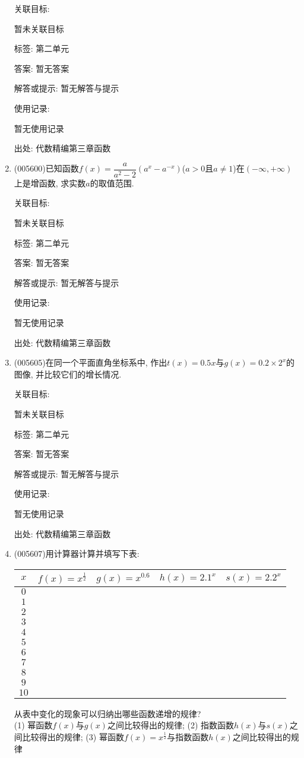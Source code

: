 \documentclass[10pt,a4paper]{article}
\begin{document}
\begin{enumerate}[1.]
关联目标:

暂未关联目标



标签: 第二单元

答案: 暂无答案

解答或提示: 暂无解答与提示

使用记录:

暂无使用记录


出处: 代数精编第三章函数
\item { (005600)}已知函数$f(x)=\dfrac a{a^2-2}(a^x-a^{-x})$($a>0$且$a\ne 1$)在$(-\infty ,+\infty)$上是增函数, 求实数$a$的取值范围.


关联目标:

暂未关联目标



标签: 第二单元

答案: 暂无答案

解答或提示: 暂无解答与提示

使用记录:

暂无使用记录


出处: 代数精编第三章函数
\item { (005605)}在同一个平面直角坐标系中, 作出$t(x)=0.5x$与$g(x)=0.2\times 2^x$的图像, 并比较它们的增长情况.


关联目标:

暂未关联目标



标签: 第二单元

答案: 暂无答案

解答或提示: 暂无解答与提示

使用记录:

暂无使用记录


出处: 代数精编第三章函数
\item { (005607)}用计算器计算并填写下表:
\begin{center}
    \begin{tabular}{|c|c|c|c|c|}
        \hline
        $x$	& $f(x)=x^{\frac 12}$ & $g(x)=x^{0.6}$ & $h(x)=2.1^x$ & $s(x)=2.2^x$ \\ \hline
        $0$ & & & & \\ \hline
        $1$ & & & & \\ \hline
        $2$ & & & & \\ \hline
        $3$ & & & & \\ \hline
        $4$ & & & & \\ \hline
        $5$ & & & & \\ \hline
        $6$ & & & & \\ \hline
        $7$ & & & & \\ \hline
        $8$ & & & & \\ \hline
        $9$ & & & & \\ \hline
        $10$ & & & & \\ \hline
    \end{tabular}
\end{center}
从表中变化的现象可以归纳出哪些函数递增的规律?\\
(1) 幂函数$f(x)$与$g(x)$之间比较得出的规律;
(2) 指数函数$h(x)$与$s(x)$之间比较得出的规律;
(3) 幂函数$f(x)=x^{\frac 12}$与指数函数$h(x)$之间比较得出的规律



\end{enumerate}
\end{document}
